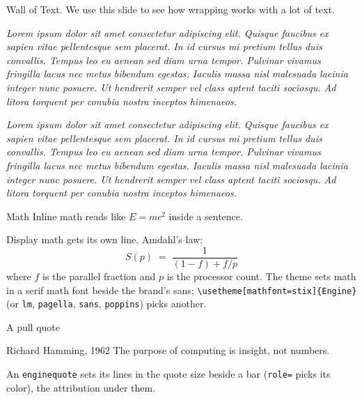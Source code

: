 \documentclass[aspectratio=\engineaspectratio]{beamer}
\begin{document}
\begin{frame}{Wall of Text.}
  \small
  We use this slide to see how wrapping works with a lot of text.

  \emph{Lorem ipsum dolor sit amet consectetur adipiscing elit. Quisque faucibus ex sapien vitae
  pellentesque sem placerat. In id cursus mi pretium tellus duis convallis. Tempus leo eu aenean
  sed diam urna tempor. Pulvinar vivamus fringilla lacus nec metus bibendum egestas. Iaculis massa
  nisl malesuada lacinia integer nunc posuere. Ut hendrerit semper vel class aptent taciti
  sociosqu. Ad litora torquent per conubia nostra inceptos himenaeos.}

  \emph{Lorem ipsum dolor sit amet consectetur adipiscing elit. Quisque faucibus ex sapien vitae
  pellentesque sem placerat. In id cursus mi pretium tellus duis convallis. Tempus leo eu aenean
  sed diam urna tempor. Pulvinar vivamus fringilla lacus nec metus bibendum egestas. Iaculis massa
  nisl malesuada lacinia integer nunc posuere. Ut hendrerit semper vel class aptent taciti
  sociosqu. Ad litora torquent per conubia nostra inceptos himenaeos.}
\end{frame}

\begin{frame}{Math}
  Inline math reads like $E = mc^2$ inside a sentence.

  Display math gets its own line. Amdahl's law:
  \begin{equation*}
    S(p) \;=\; \frac{1}{(1 - f) + f / p}
  \end{equation*}
  where $f$ is the parallel fraction and $p$ is the processor count. The theme sets math in a
  serif math font beside the brand's sans; \texttt{\textbackslash usetheme[mathfont=stix]\{Engine\}}
  (or \texttt{lm}, \texttt{pagella}, \texttt{sans}, \texttt{poppins}) picks another.
\end{frame}

\begin{frame}{A pull quote}
  \begin{enginequote}{Richard Hamming, 1962}   %
    The purpose of computing is insight, not numbers.
  \end{enginequote}
  An \texttt{enginequote} sets its lines in the quote size beside a bar (\texttt{role=} picks its
  color), the attribution under them.
\end{frame}
\end{document}
